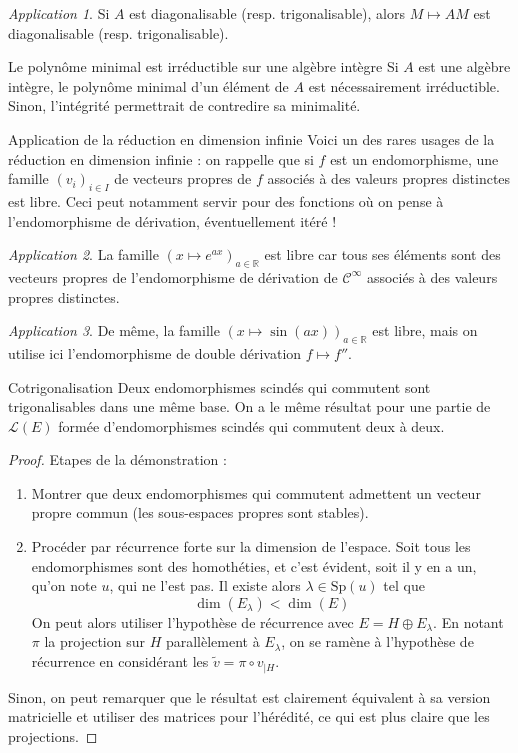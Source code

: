 \documentclass[french]{book}
\newcommand{\R}{\mathbb{R}}
\theoremstyle{plain}
\theoremstyle{definition}
\theoremstyle{remark}
\newtheorem*{app}{Application}
\begin{document}
\begin{app}
	Si $A$ est diagonalisable (resp. trigonalisable), alors $M\mapsto AM$ est diagonalisable (resp. trigonalisable).
\end{app}
\begin{AS}{Le polynôme minimal est irréductible sur une algèbre intègre} Si $A$ est une algèbre intègre, le polynôme minimal d’un élément de $A$ est nécessairement
irréductible. Sinon, l’intégrité permettrait de contredire sa minimalité.
\end{AS}
\begin{AS}{Application de la réduction en dimension infinie} Voici un des rares usages de la réduction en dimension infinie : on rappelle que si $f$ est un endomorphisme, une famille $(v_i)_{i\in I}$ de vecteurs propres de $f$ associés à des valeurs propres distinctes est libre. Ceci peut notamment servir pour des
fonctions où on pense à l’endomorphisme de dérivation, éventuellement itéré !
\end{AS}
\begin{app}
	La famille $(x\mapsto e^{ax})_{a\in\R}$ est libre car tous ses éléments sont des
vecteurs propres de l’endomorphisme de dérivation de $\mathcal{C}^{\infty}$ associés à des valeurs propres distinctes.
\end{app}
\begin{app}
De même, la famille $(x\mapsto \sin(ax))_{a\in\R}$ est libre, mais on utilise ici l’endomorphisme de double dérivation $f\mapsto f''$.
\end{app}
\begin{AS}{Cotrigonalisation} Deux endomorphismes scindés qui commutent sont trigonalisables dans une même base. On a le même résultat pour une partie de $\mathcal{L}(E)$ formée d’endomorphismes scindés qui commutent deux à deux.
\end{AS} \begin{proof}
	Etapes de la démonstration : 
\begin{enumerate}
	\item Montrer que deux endomorphismes qui commutent admettent un vecteur propre commun (les sous-espaces propres sont stables).
	\item Procéder par récurrence forte sur la dimension de l’espace. Soit tous les endomorphismes sont des homothéties, et c’est évident, soit il y en a un, qu’on
	note $u$, qui ne l’est pas. Il existe alors $\lambda\in\text{Sp}(u)$ tel que $$\dim(E_\lambda)<\dim(E)$$ On peut alors utiliser l'hypothèse de récurrence avec $E=H\oplus E_\lambda$. En notant $\pi$ la projection sur $H$ parallèlement à $E_\lambda$, on se ramène à l'hypothèse de récurrence en considérant les $\tilde{v}=\pi\circ v_{|H}$. 
\end{enumerate} Sinon, on peut remarquer que le résultat est clairement équivalent à sa version matricielle et utiliser des matrices pour l'hérédité, ce qui est plus claire que les projections.
\end{proof}
\end{document}
